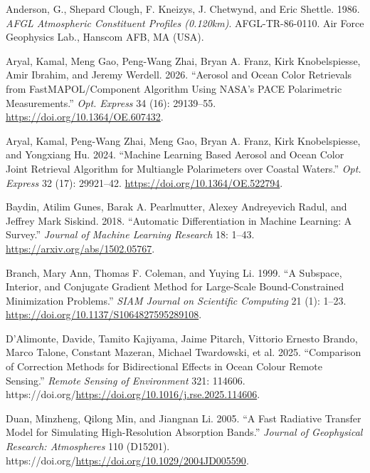 \documentclass[
  11pt,
  letterpaper,
  DIV=11,
  numbers=noendperiod]{scrreprt}
\newlength{\cslhangindent}
\newenvironment{CSLReferences}[2] %
 {\begin{list}{}{%
  \setlength{\itemindent}{0pt}
  \setlength{\leftmargin}{0pt}
  \setlength{\parsep}{0pt}
  \ifodd #1
   \setlength{\leftmargin}{\cslhangindent}
   \setlength{\itemindent}{-1\cslhangindent}
  \fi
  \setlength{\itemsep}{#2\baselineskip}}}
 {\end{list}}
\begin{document}
\label{refs}
\begin{CSLReferences}{1}{0}
Anderson, G., Shepard Clough, F. Kneizys, J. Chetwynd, and Eric Shettle.
1986. \emph{AFGL Atmospheric Constituent Profiles (0.120km)}.
AFGL-TR-86-0110. Air Force Geophysics Lab., Hanscom AFB, MA (USA).

Aryal, Kamal, Meng Gao, Peng-Wang Zhai, Bryan A. Franz, Kirk
Knobelspiesse, Amir Ibrahim, and Jeremy Werdell. 2026. {``Aerosol and
Ocean Color Retrievals from FastMAPOL/Component Algorithm Using NASA's
PACE Polarimetric Measurements.''} \emph{Opt. Express} 34 (16):
29139--55. \url{https://doi.org/10.1364/OE.607432}.

Aryal, Kamal, Peng-Wang Zhai, Meng Gao, Bryan A. Franz, Kirk
Knobelspiesse, and Yongxiang Hu. 2024. {``Machine Learning Based Aerosol
and Ocean Color Joint Retrieval Algorithm for Multiangle Polarimeters
over Coastal Waters.''} \emph{Opt. Express} 32 (17): 29921--42.
\url{https://doi.org/10.1364/OE.522794}.

Baydin, Atilim Gunes, Barak A. Pearlmutter, Alexey Andreyevich Radul,
and Jeffrey Mark Siskind. 2018. {``Automatic Differentiation in Machine
Learning: A Survey.''} \emph{Journal of Machine Learning Research} 18:
1--43. \url{https://arxiv.org/abs/1502.05767}.

Branch, Mary Ann, Thomas F. Coleman, and Yuying Li. 1999. {``A Subspace,
Interior, and Conjugate Gradient Method for Large-Scale
Bound-Constrained Minimization Problems.''} \emph{SIAM Journal on
Scientific Computing} 21 (1): 1--23.
\url{https://doi.org/10.1137/S1064827595289108}.

D'Alimonte, Davide, Tamito Kajiyama, Jaime Pitarch, Vittorio Ernesto
Brando, Marco Talone, Constant Mazeran, Michael Twardowski, et al. 2025.
{``Comparison of Correction Methods for Bidirectional Effects in Ocean
Colour Remote Sensing.''} \emph{Remote Sensing of Environment} 321:
114606. https://doi.org/\url{https://doi.org/10.1016/j.rse.2025.114606}.

Duan, Minzheng, Qilong Min, and Jiangnan Li. 2005. {``A Fast Radiative
Transfer Model for Simulating High-Resolution Absorption Bands.''}
\emph{Journal of Geophysical Research: Atmospheres} 110 (D15201).
https://doi.org/\url{https://doi.org/10.1029/2004JD005590}.


\end{CSLReferences}
\end{document}
